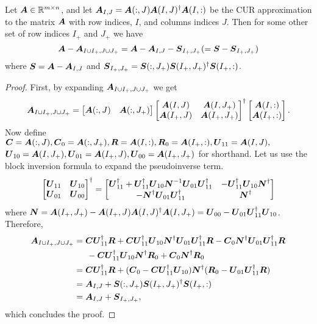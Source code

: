\begin{lemma} \label{lemma:recurrence}
Let $\boldsymbol{A} \in \mathbb{R}^{m \times n}$, and let $\boldsymbol{A}_{I,J} = \boldsymbol{A}(:, J) \boldsymbol{A}(I,J)^\dagger \boldsymbol{A}(I,:)$ be the CUR approximation to the matrix $\boldsymbol{A}$ with row indices, $I$, and columns indices $J$. Then for some other set of row indices $I_+$ and $J_+$ we  have 
    \begin{equation}
        \boldsymbol{A} - \boldsymbol{A}_{I\cup I_+, J\cup J_+} = \boldsymbol{A} - \boldsymbol{A}_{I,J} - \boldsymbol{S}_{I_+,J_+} ( = \boldsymbol{S} - \boldsymbol{S}_{I_+,J_+})
    \end{equation} where $\boldsymbol{S} = \boldsymbol{A} - \boldsymbol{A}_{I,J}$ and $\boldsymbol{S}_{I_+,J_+} = \boldsymbol{S}(:, J_+) \boldsymbol{S}(I_+,J_+)^\dagger \boldsymbol{S}(I_+,:)$.
\end{lemma}
\begin{proof}
First, by expanding $\boldsymbol{A}_{I\cup I_+, J\cup J_+}$ we get
    \begin{align*}
        \boldsymbol{A}_{I\cup I_+,J\cup J_+} = \begin{bmatrix} \boldsymbol{A}(:,J) & \boldsymbol{A}(:,J_+) \end{bmatrix}\begin{bmatrix} \boldsymbol{A}(I,J) & \boldsymbol{A}(I,J_+) \\ \boldsymbol{A}(I_+,J) & \boldsymbol{A}(I_+,J_+) \end{bmatrix}^\dagger \begin{bmatrix} \boldsymbol{A}(I,:) \\ \boldsymbol{A}(I_+,:) \end{bmatrix}.
    \end{align*} Now define $\boldsymbol{C} = \boldsymbol{A}(:,J),\boldsymbol{C}_0 = \boldsymbol{A}(:,J_+), \boldsymbol{R} = \boldsymbol{A}(I,:),\boldsymbol{R}_0 = \boldsymbol{A}(I_+,:), \boldsymbol{U}_{11} = \boldsymbol{A}(I,J),$ $\boldsymbol{U}_{10} = \boldsymbol{A}(I,J_+),\boldsymbol{U}_{01} = \boldsymbol{A}(I_+,J),\boldsymbol{U}_{00} = \boldsymbol{A}(I_+,J_+)$ for shorthand. Let us use the block inversion formula to expand the pseudoinverse term.
    \begin{equation}
        \begin{bmatrix} \boldsymbol{U}_{11} & \boldsymbol{U}_{10} \\ \boldsymbol{U}_{01} & \boldsymbol{U}_{00} \end{bmatrix}^\dagger = \begin{bmatrix} \boldsymbol{U}_{11}^\dagger + \boldsymbol{U}_{11}^\dagger \boldsymbol{U}_{10} \boldsymbol{N}^{-1}\boldsymbol{U}_{01}\boldsymbol{U}_{11}^\dagger  & -\boldsymbol{U}_{11}^\dagger \boldsymbol{U}_{10} \boldsymbol{N}^\dagger \\ -\boldsymbol{N}^\dagger \boldsymbol{U}_{01}\boldsymbol{U}_{11}^\dagger  & \boldsymbol{N}^\dagger \end{bmatrix}
    \end{equation} where $\boldsymbol{N} = \boldsymbol{A}(I_+,J_+) - \boldsymbol{A}(I_+,J)\boldsymbol{A}(I,J)^\dagger \boldsymbol{A}(I,J_+) = \boldsymbol{U}_{00} - \boldsymbol{U}_{01}\boldsymbol{U}_{11}^\dagger \boldsymbol{U}_{10}$. Therefore,
    \begin{align*}
        \mat{A}_{I\cup I_+,J\cup J_+}  &= \mat{C}\mat{U}_{11}^\dagger \mat{R} + \mat{C}\mat{U}_{11}^\dagger \mat{U}_{10}\mat{N}^\dagger \mat{U}_{01}\mat{U}_{11}^\dagger \mat{R} - \mat{C}_0 \mat{N}^\dagger \mat{U}_{01}\mat{U}_{11}^\dagger \mat{R}\\
        & \indent  - \mat{C}\mat{U}_{11}^\dagger \mat{U}_{10}\mat{N}^\dagger \mat{R}_0 + \mat{C}_0 \mat{N}^\dagger \mat{R}_0 \\
        &= \mat{C}\mat{U}_{11}^\dagger \mat{R} + (\mat{C}_0 - \mat{C}\mat{U}_{11}^\dagger \mat{U}_{10})\mat{N}^\dagger (\mat{R}_0 - \mat{U}_{01}\mat{U}_{11}^\dagger \mat{R}) \\
        &= \mat{A}_{I,J} + \mat{S}(:,J_+) \mat{S}(I_+,J_+)^\dagger \mat{S}(I_+,:) \\
        &= \mat{A}_{I,J} + \mat{S}_{I_+,J_+},
    \end{align*} which concludes the proof.
\end{proof}


